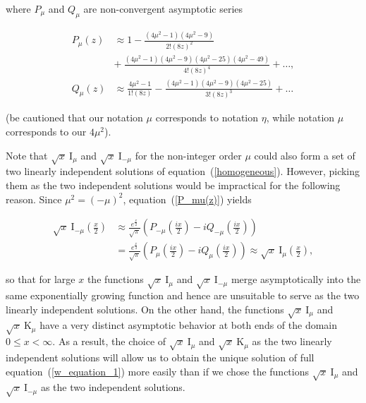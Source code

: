 \documentclass[draft]{agujournal2019}
\begin{document}
where $P_{\mu}$ and $Q_{\mu}$ are non-convergent asymptotic series
\begin{linenomath*}
\begin{subequations}
\label{PQ_mu(z)}
\begin{align}
P_{\mu}(z)  &  \approx1-\frac{\left(  4\mu^{2}-1\right)  \left(  4\mu
^{2}-9\right)  }{2!\left(  8z\right)  ^{2}}\nonumber\\
&  +~\frac{\left(  4\mu^{2}-1\right)  \left(  4\mu^{2}-9\right)  \left(
4\mu^{2}-25\right)  \left(  4\mu^{2}-49\right)  }{4!\left(  8z\right)  ^{4}
}+\ldots,\label{P_mu(z)}\\
Q_{\mu}(z)  &  \approx\frac{4\mu^{2}-1}{1!\left(  8z\right)  }-\frac{\left(
4\mu^{2}-1\right)  \left(  4\mu^{2}-9\right)  \left(  4\mu^{2}-25\right)
}{3!\left(  8z\right)  ^{3}}+\ldots
\label{Q_mu(z)}
\end{align}
\end{subequations}
\end{linenomath*}
(be cautioned that our notation $\mu$ corresponds to
 notation $\eta$, while 
notation $\mu$ corresponds to our $4\mu^{2}$).

Note that $\sqrt{x}\ \mathrm{I}_{\mu}$ and $\sqrt{x}\ \mathrm{I}_{-\mu}$ for
the non-integer order $\mu$ could also form a set of two linearly independent
solutions of equation~(\ref{homogeneous}). However, picking them as the two independent solutions would be
impractical for the following reason. Since $\mu^{2}=(-\mu)^{2}$, equation~(\ref{P_mu(z)}) yields
\begin{linenomath*}
\begin{align*}
\sqrt{x}\ \mathrm{I}_{-\mu}\left(  \frac{x}{2}\right)   &  \approx\frac{e^{\frac
{x}{2}}}{\sqrt{\pi}}\left(  P_{-\mu}\left(  \frac{ix}{2}\right)  -iQ_{-\mu
}\left(  \frac{ix}{2}\right)  \right) \\
&  =\frac{e^{\frac{x}{2}}}{\sqrt{\pi}}\left(  P_{\mu}\left(  \frac{ix}%
{2}\right)  -iQ_{\mu}\left(  \frac{ix}{2}\right)  \right) \approx\sqrt
{x}\ \mathrm{I}_{\mu}\left(  \frac{x}{2}\right)  ,
\end{align*}
\end{linenomath*}
so that for large $x$ the functions $\sqrt{x}\ \mathrm{I}_{\mu}$ and $\sqrt
{x}\ \mathrm{I}_{-\mu}$ merge asymptotically into the same exponentially growing function and hence
are unsuitable to serve as the two linearly independent solutions. On the other hand, the functions $\sqrt{x}\ \mathrm{I}_{\mu}$
and $\sqrt{x}\ \mathrm{K}_{\mu}$ have a very distinct asymptotic behavior at both ends of the domain $0\leq x < \infty$. 
As a result, the choice of $\sqrt{x}\ \mathrm{I}_{\mu}$
and $\sqrt{x}\ \mathrm{K}_{\mu}$ as the two linearly independent solutions
will allow us to obtain the unique solution of full
equation~(\ref{w_equation_1}) more easily than
if we chose the functions $\sqrt{x}\ \mathrm{I}_{\mu}$ and $\sqrt
{x}\ \mathrm{I}_{-\mu}$ as the two independent solutions.
\end{document}
